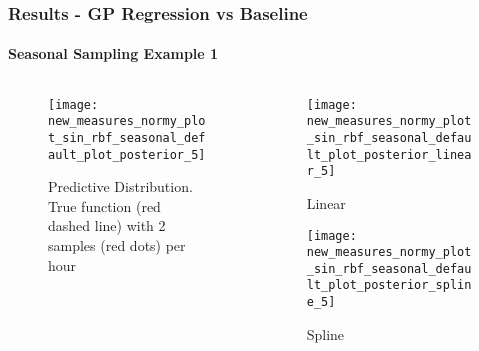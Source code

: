 \documentclass[
	8pt, %
]{beamer}
\begin{document}
\begin{frame}
	\frametitle{Results - GP Regression vs Baseline}
	\framesubtitle{Seasonal Sampling Example 1}

	\begin{columns}[c] %
		\begin{column}{0.5\textwidth} %
				\begin{figure}
					\texttt{[image: new\_measures\_normy\_plot\_sin\_rbf\_seasonal\_default\_plot\_posterior\_5]}
					\caption{Predictive Distribution. True function (red dashed line) with 2 samples (red dots) per hour}
				\end{figure}
		\end{column}
		\begin{column}{0.5\textwidth} %
				\begin{figure}
					\texttt{[image: new\_measures\_normy\_plot\_sin\_rbf\_seasonal\_default\_plot\_posterior\_linear\_5]}
					\caption{Linear}
				\end{figure}

				\begin{figure}
					\texttt{[image: new\_measures\_normy\_plot\_sin\_rbf\_seasonal\_default\_plot\_posterior\_spline\_5]}
					\caption{Spline}
				\end{figure}
		\end{column}
	\end{columns}

\end{frame}
\end{document}
